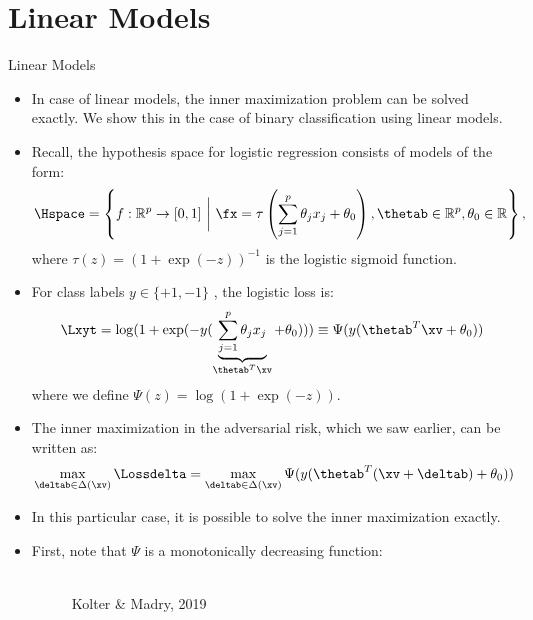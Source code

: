 \section{Linear Models}
\begin{vbframe} {Linear Models}
  \begin{itemize}
    \item In case of linear models, the inner maximization problem can be solved exactly. We show this in the case of binary classification using linear models.
    \item Recall, the hypothesis space for logistic regression consists of models of the form:
          \small
          $$\Hspace = \left\{f: \mathbb{R}^p \to [0, 1] ~\bigg|~ \fx = \tau\left(\sum_{j = 1}^p \theta_j x_j + \theta_0 \right), \thetab \in \mathbb{R}^p, \theta_0 \in \mathbb{R} \right\},$$
          \normalsize
          where $\tau(z) = (1 + \exp(-z))^{-1}$ is the logistic sigmoid function. 
    \item For class labels $y \in \{+1,-1\}$ , the logistic loss is:
          \small
          $$\Lxyt = \log(1 + \exp(- {y (\underbrace{\sum_{j = 1}^p \theta_j x_j}_{\thetab^T\xv} + \theta_0))}) \equiv \Psi(y (\thetab^T\xv + \theta_0))$$
          \normalsize
          where we define $\Psi(z) = \log(1+\exp(-z))$.
  \end{itemize}

\framebreak

  \begin{itemize}
    \item The inner maximization in the adversarial risk, which we saw earlier, can be written as:
    $$\max_{\deltab \in \Delta(\xv)} \Lossdelta = \max_{\deltab \in \Delta(\xv)} \Psi(y (\thetab^T(\xv + \deltab) + \theta_0)) $$
    \item In this particular case, it is possible to solve the inner maximization exactly.
    \item First, note that $\Psi$ is a monotonically decreasing function:
    \begin{figure}
    \centering
      \tiny{\\Kolter \& Madry, 2019}
    \end{figure}
  \end{itemize}


\end{vbframe}
